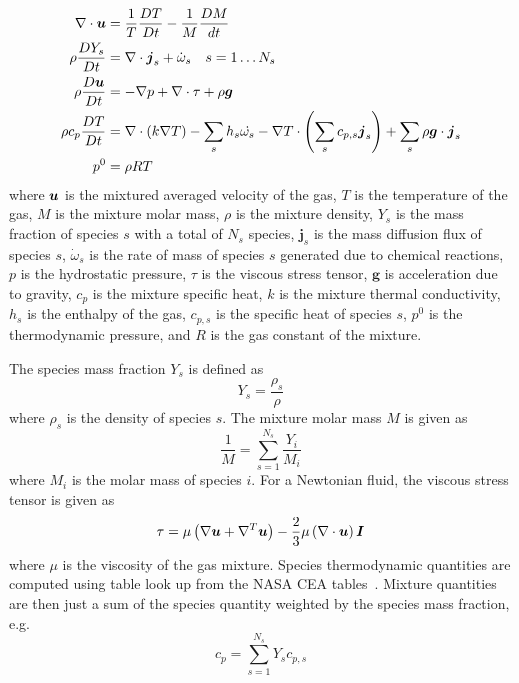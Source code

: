 \begin{equation}
\begin{aligned}
\nabla \cdot \bu &= \frac{1}{T}\frac{DT}{Dt} - \frac{1}{M}\frac{DM}{dt} \\ %
\rho \frac{D Y_s}{D t} &= \nabla \cdot \boldsymbol{j}_s + \dot{\omega}_s \quad s = 1 \dots N_s \\
\rho \frac{D\bu}{Dt} &= -\nabla p + \nabla \cdot \mathbf{\tau} + \rho \boldsymbol{g} \\
\rho c_p \frac{DT}{Dt} %
&= \nabla \cdot \left(k \nabla T \right) - \sum_s h_s \dot{\omega_s} -
\nabla T  \cdot \left( \sum_{s} c_{p,s} \boldsymbol{j}_s \right) +
\sum_{s} \rho \boldsymbol{g} \cdot \boldsymbol{j}_s \\
p^0 &= \rho R T
\end{aligned}
\end{equation}
where $\boldsymbol{u}$ is the mixtured averaged velocity of the gas, $T$ is the temperature of the
gas, $M$ is the mixture molar mass, $\rho$ is the mixture density,
$Y_s$ is the mass fraction of species $s$ with a total of $N_s$ species, $\boldsymbol{j}_s$ is the
mass diffusion flux of species $s$, $\dot{\omega}_s$ is the rate of mass of
species $s$ generated due to chemical reactions, $p$ is the
hydrostatic pressure, $\tau$ is the viscous stress tensor,
$\boldsymbol{g}$ is acceleration due to gravity, $c_p$ is the mixture
specific heat, $k$ is the mixture thermal conductivity, $h_s$ is the
enthalpy of the gas, $c_{p,s}$ is the specific heat of species $s$,
$p^0$ is the thermodynamic pressure, and $R$ is the gas constant of
the mixture.

The species mass fraction $Y_s$ is defined as
%
\begin{equation}
  Y_s = \frac{\rho_s}{\rho}
\end{equation}
%
where $\rho_s$ is the density of species $s$.
The mixture molar mass $M$ is given as
%
\begin{equation}
  \frac{1}{M} = \sum_{s=1}^{N_s} \frac{Y_i}{M_i}
\end{equation}
%
where $M_i$ is the molar mass of species $i$.
%
For a Newtonian fluid, the viscous stress tensor is given as
%
\begin{equation}\label{eq:stress_tensor}
  \tau = \mu\left(\nabla\boldsymbol{u} + \nabla^{T}\boldsymbol{u}\right) -\frac{2}{3}\mu \left(\nabla\cdot\boldsymbol{u}\right)\boldsymbol{I}
\end{equation}
%
where $\mu$ is the viscosity of the gas mixture.
%
Species thermodynamic quantities are computed using table look up from the NASA
CEA tables~\cite{CEATables}.
Mixture quantities are then just a sum of the species
quantity weighted by the species mass fraction, e.g.
%
\begin{equation}
  c_p = \sum_{s=1}^{N_s} Y_s c_{p,s}
\end{equation}
%

